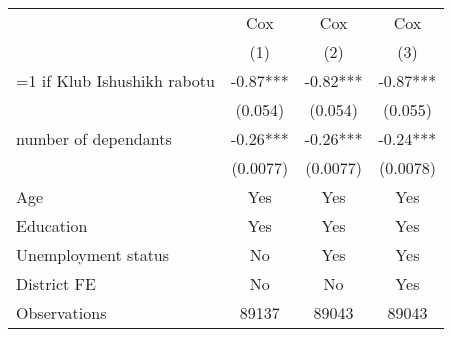 {
\def\sym#1{\ifmmode^{#1}\else\(^{#1}\)\fi}
\begin{tabular}{l*{3}{c}}
\toprule
                &\multicolumn{1}{c}{Cox}&\multicolumn{1}{c}{Cox}&\multicolumn{1}{c}{Cox}\\
\cmidrule{2-4}
 & (1) & (2) & (3) \\
\midrule
=1 if Klub Ishushikh rabotu&    -0.87***&    -0.82***&    -0.87***\\
                &  (0.054)   &  (0.054)   &  (0.055)   \\
\addlinespace
number of dependants&    -0.26***&    -0.26***&    -0.24***\\
                & (0.0077)   & (0.0077)   & (0.0078)   \\

\midrule 
Age & Yes & Yes & Yes \\
Education & Yes & Yes & Yes \\
Unemployment status & No & Yes & Yes \\
District FE & No & No & Yes \\
\midrule
Observations    &    89137   &    89043   &    89043   \\
\bottomrule
\end{tabular}
}
